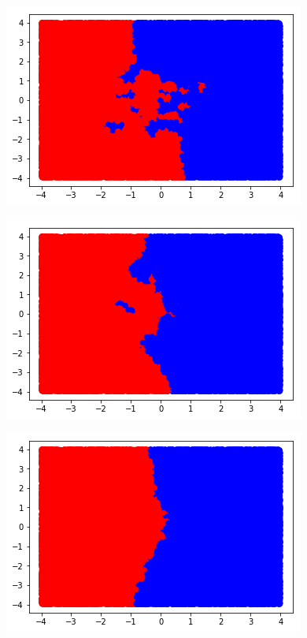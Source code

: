\documentclass[12pt, a4paper]{article}
\begin{document}
\begin{figure}[H]
	\begin{minipage}[b]{.3\linewidth}
		\includegraphics[width = \textwidth]{cien_mil_puntos_1_vecino}
		\label{fig:cien_mil_1}
	\end{minipage}
	\begin{minipage}[b]{.3\linewidth}
		\includegraphics[width = \textwidth]{cien_mil_puntos_3_vecino}
		\label{fig:cien_mil_3}
	\end{minipage}
	\begin{minipage}[b]{.3\linewidth}
		\includegraphics[width = \textwidth]{cien_mil_puntos_13_vecino}

\end{minipage}
\end{figure}
\end{document}
